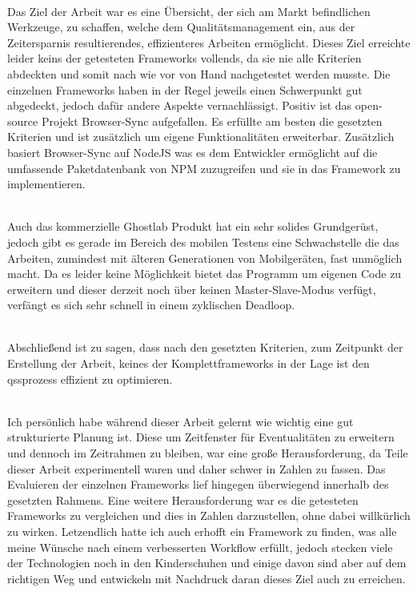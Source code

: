 \\
Das Ziel der Arbeit war es eine Übersicht, der sich am Markt befindlichen Werkzeuge, zu schaffen, welche dem Qualitätsmanagement ein, aus der Zeitersparnis resultierendes, effizienteres Arbeiten ermöglicht. Dieses Ziel erreichte leider keins der getesteten \Gls{Framework}s vollends, da sie nie alle Kriterien abdeckten und somit nach wie vor von Hand nachgetestet werden musste. 
Die einzelnen \Gls{Framework}s haben in der Regel jeweils einen Schwerpunkt gut abgedeckt, jedoch dafür andere Aspekte vernachlässigt. Positiv ist das open-source Projekt Browser-Sync aufgefallen. Es erfüllte am besten die gesetzten Kriterien und ist zusätzlich um eigene Funktionalitäten erweiterbar. Zusätzlich basiert Browser-Sync auf \gls{NodeJS} was es dem Entwickler ermöglicht auf die umfassende Paketdatenbank von \Gls{NPM} zuzugreifen und sie in das \Gls{Framework} zu implementieren. 

\\Auch das kommerzielle Ghostlab Produkt hat ein sehr solides Grundgerüst, jedoch gibt es gerade im Bereich des mobilen Testens eine Schwachstelle die das Arbeiten, zumindest mit älteren Generationen von Mobilgeräten, fast unmöglich macht. Da es leider keine Möglichkeit bietet das Programm um eigenen Code zu erweitern und dieser derzeit noch über keinen Master-Slave-Modus verfügt, verfängt es sich sehr schnell in einem zyklischen Deadloop.

\\Abschließend ist zu sagen, dass nach den gesetzten Kriterien, zum Zeitpunkt der Erstellung der Arbeit, keines der Komplettframeworks in der Lage ist den \Gls{qs}sprozess effizient zu optimieren.

\\Ich persönlich habe während dieser Arbeit gelernt wie wichtig eine gut strukturierte Planung ist. Diese um Zeitfenster für Eventualitäten zu erweitern und dennoch im Zeitrahmen zu bleiben, war eine große Herausforderung, da Teile dieser Arbeit experimentell waren und daher schwer in Zahlen zu fassen. Das Evaluieren der einzelnen \Gls{Framework}s lief hingegen überwiegend innerhalb des gesetzten Rahmens. Eine weitere Herausforderung war es die getesteten \Gls{Framework}s zu vergleichen und dies in Zahlen darzustellen, ohne dabei willkürlich zu wirken. Letzendlich hatte ich auch erhofft ein \Gls{Framework} zu finden, was alle meine Wünsche nach einem verbesserten Workflow erfüllt, jedoch stecken viele der Technologien noch in den Kinderschuhen und einige davon sind aber auf dem richtigen Weg und entwickeln mit Nachdruck daran dieses Ziel auch zu erreichen.


